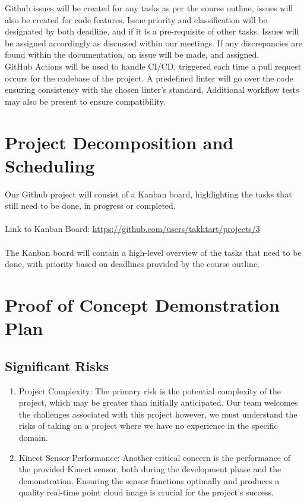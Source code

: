 \documentclass{article}
\begin{document}
Github issues will be created for any tasks as per the course outline, issues will also be created for code features.
Issue priority and classification will be designated by both deadline, and if it is a pre-requisite of other tasks.
Issues will be assigned accordingly as discussed within our meetings. 
If any discrepancies are found within the documentation, an issue will be made, and assigned.\\

GitHub Actions will be used to handle CI/CD, triggered each time a pull request occurs for the codebase of the project. 
A predefined linter will go over the code ensuring consistency with the chosen linter's standard. 
Additional workflow tests may also be present to ensure compatibility.


\section{Project Decomposition and Scheduling}

Our Github project will consist of a Kanban board, highlighting the tasks that still need to be done, in progress or completed.\\
\\
\noindent Link to Kanban Board:
\noindent\href{https://github.com/users/takhtart/projects/3}{https://github.com/users/takhtart/projects/3}\\
\\
The Kanban board will contain a high-level overview of the tasks that need to be done, 
with priority based on deadlines provided by the course outline.

\section{Proof of Concept Demonstration Plan}

\subsection*{Significant Risks}
\begin{enumerate}
\item Project Complexity: The primary risk is the potential complexity of the project, which may be greater than initially anticipated. 
Our team welcomes the challenges associated with this project however, we must understand the risks of taking on a project where we have no experience in the specific domain.

\item Kinect Sensor Performance: Another critical concern is the performance of the provided Kinect sensor, both during the development phase and the demonstration. 
Ensuring the sensor functions optimally and produces a quality real-time point cloud image is crucial for the project's success.

\end{enumerate}
\end{document}
